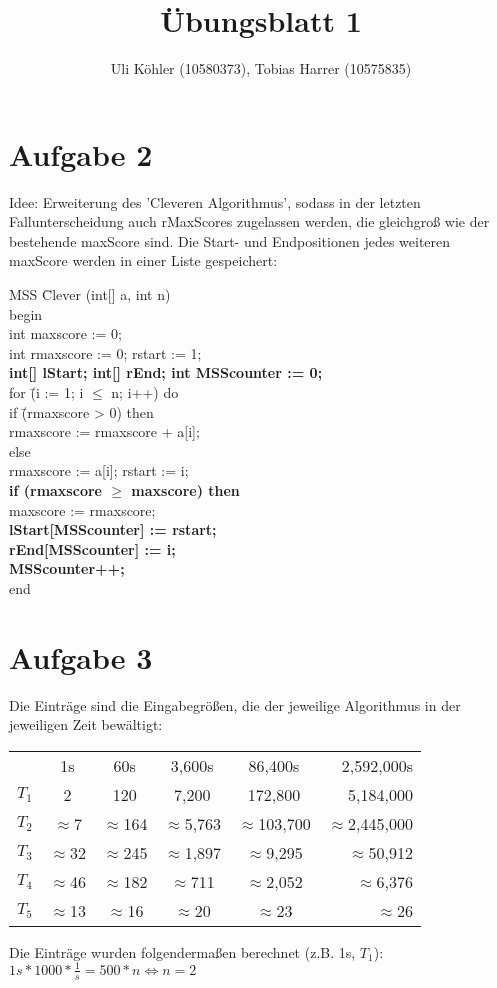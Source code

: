 \documentclass[a4paper,10pt]{article}
\title{Übungsblatt 1}
\author{Uli Köhler (10580373), Tobias Harrer (10575835)}
\begin{document}
\maketitle

\section{Aufgabe 2}
Idee: Erweiterung des 'Cleveren Algorithmus', sodass in der letzten Fallunterscheidung auch rMaxScores zugelassen werden,
die gleichgroß wie der bestehende maxScore sind. Die Start- und Endpositionen jedes weiteren maxScore werden in einer Liste gespeichert:
\newline
\begin{tabbing}
MSS \= Clever (int[] a, int n)\\
begin\\
\>int maxscore   := 0;\\
\>int rmaxscore  := 0; rstart := 1;\\
\>\textbf{int[] lStart; int[] rEnd; int MSScounter := 0;}\\
\>for \= (i := 1; i $\leq$ n; i++) do\\
\> \>if \=(rmaxscore > 0) then\\
\> \> \>rmaxscore := rmaxscore + a[i];\\
\> \> else \= \\
\> \> \>rmaxscore := a[i]; rstart := i;\\
\> \>\textbf{if (rmaxscore $\geq$ maxscore) then}\\
\> \> \> maxscore := rmaxscore; \\ \> \> \> \textbf{lStart[MSScounter] := rstart;}\\ \> \> \> \textbf{rEnd[MSScounter] := i;}\\
\> \> \>  \textbf{MSScounter++;}\\
end 
\end{tabbing}

\section{Aufgabe 3}
Die Einträge sind die Eingabegrößen, die der jeweilige Algorithmus in der jeweiligen Zeit bewältigt:\newline
 \begin{tabular}{lccccr}
   & 1s & 60s & 3,600s & 86,400s & 2,592,000s \\
  $T_1$ & 2 &120 &	7,200 &	172,800 &5,184,000 \\
  $T_2$&$\approx$7&$\approx$164&$\approx$5,763&$\approx$103,700 &$\approx$2,445,000\\
  $T_3$&$\approx$32&$\approx$245&$\approx$1,897&$\approx$9,295&$\approx$50,912\\
  $T_4$&$\approx$46&$\approx$182&$\approx$711&$\approx$2,052&$\approx$6,376\\
  $T_5$&$\approx$13&$\approx$16&$\approx$20&$\approx$23&$\approx$26\\
 \end{tabular}
\newline Die Einträge wurden folgendermaßen berechnet (z.B. 1s, $T_1$):\newline
$1s * 1000* \frac{1}{s} = 500 * n \Leftrightarrow n = 2$
\end{document}
